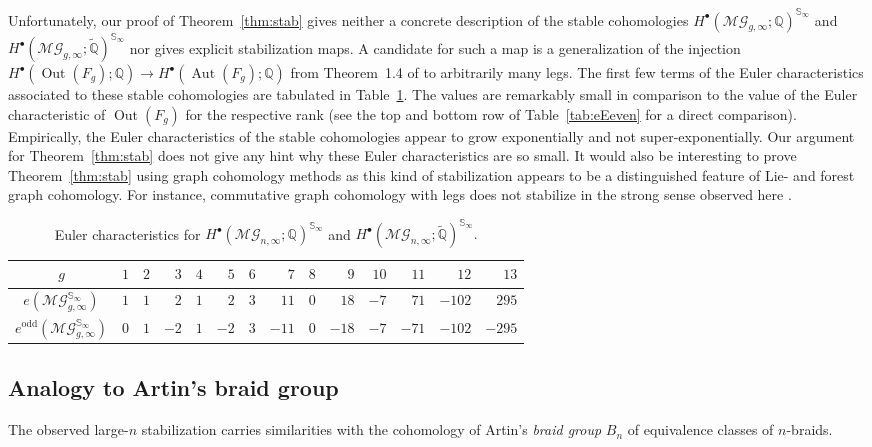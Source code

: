 \documentclass[oneside]{amsart}
\theoremstyle{remark}
\newcommand{\Q}{\mathbb{Q}}
\newcommand{\tQ}{\widetilde{\Q}}
\DeclareMathOperator{\SG}{{\mathbb S}}
\newcommand{\Aut}{{\operatorname{Aut}}}
\newcommand{\Out}{{\operatorname{Out}}}
\newcommand{\MG}{\mathcal{MG}}
\begin{document}
%
%

Unfortunately, our proof of Theorem~\ref{thm:stab} gives neither a concrete description of the stable cohomologies
$ H^\bullet(\MG_{g,\infty};\Q)^{\SG_\infty} $
and 
$ H^\bullet(\MG_{g,\infty};\tQ)^{\SG_\infty} $
nor gives explicit stabilization maps. A candidate for such a map is a generalization of the injection $H^\bullet(\Out(F_g);\Q) \rightarrow H^\bullet(\Aut(F_g);\Q)$ from Theorem~1.4 of \cite{conant2016assembling} to arbitrarily many legs.
%
%
%
%
The first few terms of the Euler characteristics associated to these stable cohomologies are tabulated in Table~\ref{tab:stable}.
The values are remarkably small in comparison to the value of the Euler characteristic of $\Out(F_g)$ for the respective rank (see the top and bottom row of Table~\ref{tab:eEeven} for a direct comparison). Empirically, the Euler characteristics of the stable cohomologies appear to grow exponentially and not super-exponentially.
Our argument for Theorem~\ref{thm:stab} does not give any hint why these Euler characteristics  are so small.
%
It would also be interesting to prove Theorem~\ref{thm:stab} using graph cohomology methods as this kind of stabilization appears to be a distinguished feature of Lie- and forest graph cohomology. For instance, commutative graph cohomology with legs does not stabilize in the strong sense observed here \cite{turchin2017commutative}. 

%
%

\begin{table}
\renewcommand{\arraystretch}{1.5}
\begin{centering}
\begin{tabular}{c|r r r r r r r r r r r r r}
$g$& $1$&$2$&$3$&$4$&$5$&$6$&$7$&$8$&$9$&$10$&$11$&$12$&$13$ \\
\hline
$e(\MG_{g,\infty}^{\SG_\infty})$& $1$&$1$&$2$&$1$&$2$&$3$&$11$&$0$&$18$&$-7$&$71$&$-102$&$295$ \\
$e^{\mathrm{odd}}(\MG_{g,\infty}^{\SG_\infty})$& $0$&$1$&$-2$&$1$&$-2$&$3$&$-11$&$0$&$-18$&$-7$&$-71$&$-102$&$-295$ \\
\end{tabular}
\end{centering}
\caption{Euler characteristics for $H^\bullet(\MG_{n,\infty}; \Q)^{\SG_\infty}$ and $H^\bullet(\MG_{n,\infty}; \tQ)^{\SG_\infty}.$}
\label{tab:stable}
\end{table}

\subsection{Analogy to Artin's braid group}
The observed large-$n$ stabilization carries similarities with the cohomology of Artin's \emph{braid group} $B_n$ of 
equivalence classes of $n$-braids.
\end{document}
